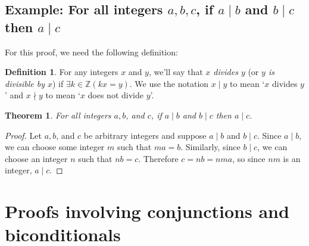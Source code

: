 \documentclass{report}
\newtheorem*{theorem}{Theorem}
\theoremstyle{definition}
\newtheorem*{definition}{Definition}
\begin{document}
\subsection{Example: For all integers $a,b,c$, if $a\mid b$ and $b\mid c$ then $a\mid c$}
For this proof, we need the following definition:
\begin{definition}
For any integers $x$ and $y$, we'll say that \textit{$x$ divides $y$} (or \textit{$y$ is divisible by $x$}) if $\exists k\in\mathbb{Z}(kx=y)$. We use the notation $x\mid y$ to mean 
`$x$ divides $y$' and $x\nmid y$ to mean `$x$ does not divide $y$'.
\end{definition}
\begin{theorem}
For all integers $a,b$, and $c$, if $a\mid b$ and $b\mid c$ then $a\mid c$.
\end{theorem}
\begin{proof}
Let $a,b$, and $c$ be arbitrary integers and suppose $a\mid b$ and $b\mid c$. Since $a\mid b$, we can choose some integer $m$ such that $ma=b$. Similarly, since $b\mid c$, we can choose an integer
$n$ such that $nb=c$. Therefore $c=nb=nma$, so since $nm$ is an integer, $a\mid c$.
\end{proof}
\newpage

\section{Proofs involving conjunctions and biconditionals}
\end{document}
